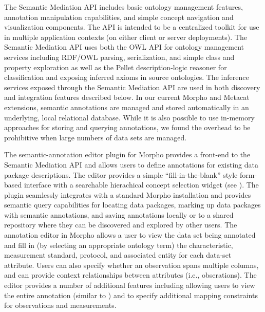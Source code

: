  The Semantic Mediation API
includes basic ontology management features, annotation manipulation
capabilities, and simple concept navigation and visualization
components. The API is intended to be a centralized toolkit for use in
multiple application contexts (on either client or server
deployments).  The Semantic Mediation API uses both the OWL API
\cite{owlapi} for ontology management services including RDF/OWL
parsing, serialization, and simple class and property exploration as
well as the Pellet description-logic reasoner \cite{pellet} for
classification and exposing inferred axioms in source ontologies. The
inference services exposed through the Semantic Mediation API are used
in both discovery and integration features described below.
In our current Morpho and Metacat extensions, semantic annotations are
managed and stored automatically in an underlying, local relational
database. While it is also possible to use in-memory approaches for
storing and querying annotations, we found the overhead to be
prohibitive when large numbers of data sets are managed.




  The semantic-annotation editor
plugin for Morpho provides a front-end to the Semantic Mediation API
and allows users to define annotations for existing data package
descriptions. The editor provides a simple ``fill-in-the-blank'' style
form-based interface with a searchable hierachical concept selection
widget (see ). The plugin seamlessly
integrates with a standard Morpho installation and provides semantic
query capabilities for locating data packages, marking up data
packages with semantic annotations, and saving annotations locally or
to a shared repository where they can be discovered and explored by
other users. The annotation editor in Morpho allows a user to view the
data set being annotated and fill in (by selecting an appropriate
ontology term) the characteristic, measurement standard, protocol, and
associated entity for each data-set attribute. Users can also specify
whether an observation spans multiple columns, and can provide context
relationships between attributes (i.e., obserations). The editor
provides a number of additional features including allowing users to
view the entire annotation (similar to )
and to specify additional mapping constraints for observations and
measurements.

